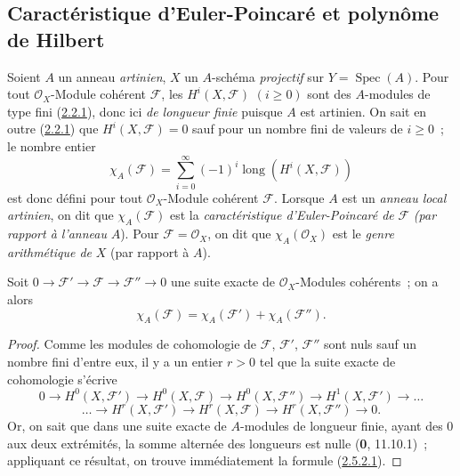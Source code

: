 \subsection{Caractéristique d'Euler-Poincaré et polynôme de Hilbert}
\label{subsection:III.2.5-fr}

\begin{env}[2.5.1]
\label{III.2.5.1-fr}
Soient $A$ un anneau \emph{artinien}, $X$ un $A$-schéma \emph{projectif} sur
$Y=\operatorname{Spec}(A)$. Pour tout $\mathcal O_X$-Module cohérent
$\mathcal F$, les $H^i(X,\mathcal F)$ $(i\geq0)$ sont des $A$-modules de
type fini (\hyperref[III.2.2.1-fr]{2.2.1}), donc ici \emph{de longueur finie}
puisque $A$ est artinien. On sait en outre
(\hyperref[III.2.2.1-fr]{2.2.1}) que $H^i(X,\mathcal F)=0$ sauf pour un
nombre fini de valeurs de $i\geq0$~; le nombre entier
\[
\chi_A(\mathcal F)=\sum_{i=0}^{\infty}(-1)^i
\operatorname{long}(H^i(X,\mathcal F))
\tag{2.5.1.1}\label{III.2.5.1.1-fr}
\]
est donc défini pour tout $\mathcal O_X$-Module cohérent $\mathcal F$.
Lorsque $A$ est un \emph{anneau local artinien}, on dit que $\chi_A(\mathcal F)$
est la \emph{caractéristique d'Euler-Poincaré de} $\mathcal F$ \emph{(par rapport à
l'anneau} $A$). Pour $\mathcal F=\mathcal O_X$, on dit que
$\chi_A(\mathcal O_X)$ est le \emph{genre arithmétique de} $X$ (par rapport à
$A$).
\end{env}

\begin{proposition}[2.5.2]
\label{III.2.5.2-fr}
Soit
$0\longrightarrow\mathcal F'\longrightarrow\mathcal F
\longrightarrow\mathcal F''\longrightarrow0$
une suite exacte de $\mathcal O_X$-Modules cohérents~; on a alors
\[
\chi_A(\mathcal F)=\chi_A(\mathcal F')+\chi_A(\mathcal F'').
\tag{2.5.2.1}\label{III.2.5.2.1-fr}
\]
\end{proposition}

\begin{proof}
Comme les modules de cohomologie de $\mathcal F$, $\mathcal F'$,
$\mathcal F''$ sont nuls sauf un nombre fini d'entre eux, il y a un
entier $r>0$ tel que la suite exacte de cohomologie s'écrive
\[
0\to H^0(X,\mathcal F')\to H^0(X,\mathcal F)
\to H^0(X,\mathcal F'')\to H^1(X,\mathcal F')\to\ldots
\]
\[
\ldots\to H^r(X,\mathcal F')\to H^r(X,\mathcal F)
\to H^r(X,\mathcal F'')\to0.
\]
Or, on sait que dans une suite exacte de $A$-modules de longueur finie,
ayant des 0 aux deux extrémités, la somme alternée des longueurs est
nulle (\textbf{0}, 11.10.1)~; appliquant ce résultat, on trouve immédiatement la
formule (\hyperref[III.2.5.2.1-fr]{2.5.2.1}).
\end{proof}

